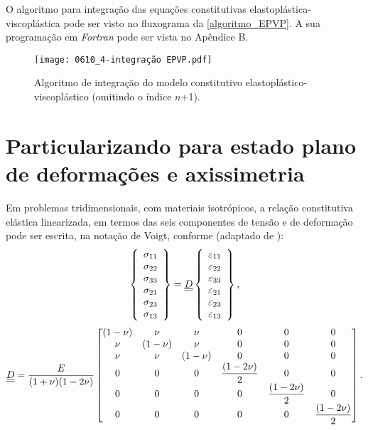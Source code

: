 O algoritmo para integração das equações constitutivas elastoplástica-viscoplástica pode ser visto no fluxograma da \autoref{algoritmo_EPVP}. A sua programação em \textit{Fortran} pode ser vista no Apêndice B.
\begin{figure}[H]
	\begin{center}
		\texttt{[image: 0610\_4-integração EPVP.pdf]}
	\end{center}
	\caption{\label{algoritmo_EPVP}Algoritmo de integração do modelo constitutivo elastoplástico-viscoplástico (omitindo o índice $n$+1).}
\end{figure}

\section{Particularizando para estado plano de deformações e axissimetria}
Em problemas tridimensionais, com materiais isotrópicos, a relação constitutiva elástica linearizada, em termos das seis componentes de tensão e de deformação pode ser escrita, na notação de Voigt, conforme (adaptado de ):
\begin{equation}
	\label{eq:Dl}
	\left\{\begin{array}{lcl}
		\sigma_{11} \\
		\sigma_{22} \\
		\sigma_{33} \\
		\sigma_{21} \\
		\sigma_{23} \\
		\sigma_{13} 
	\end{array}\right\} = 
	\underline{\underline D}
	\left\{\begin{array}{lcl}
	\varepsilon_{11} \\
	\varepsilon_{22} \\
	\varepsilon_{33} \\
	\varepsilon_{21} \\
	\varepsilon_{23} \\
	\varepsilon_{13} 
\end{array}\right\},
\end{equation}
\begin{equation}
	\underline{\underline D} = 
	\dfrac{E}{(1+\nu)(1-2\nu)} 
	\begin{bmatrix}
	(1-\nu)	& \nu 		& \nu  		& 0	 		& 0 			& 0 \\
	\nu 	& (1-\nu)	& \nu  		& 0		 	& 0				& 0  \\
	\nu 	& \nu 		& (1-\nu)   & 0		 	& 0 			& 0  \\
	0		& 0			& 0		    & \dfrac{(1-2\nu)}{2} & 0 			& 0  \\
	0		& 0			& 0		    & 0	       	& \dfrac{(1-2\nu)}{2}	& 0  \\
	0		& 0			& 0		    & 0	       	& 0         	& \dfrac{(1-2\nu)}{2}
	\end{bmatrix}.
\end{equation}

